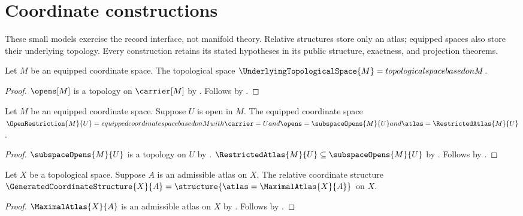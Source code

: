 

\section{Coordinate constructions}

These small models exercise the record interface, not manifold theory.
Relative structures store only an atlas; equipped spaces also store their
underlying topology. Every construction retains its stated hypotheses in
its public structure, exactness, and projection theorems.

\begin{construction}\label{underlying_topological_space}
    Let $M$ be an equipped coordinate space.
    The topological space $\UnderlyingTopologicalSpace{M}=
        topological space based on M$.
\end{construction}
\begin{proof}
    $\opens[M]$ is a topology on $\carrier[M]$
        by .
    Follows by .
\end{proof}

\begin{construction}\label{open_restriction}
    Let $M$ be an equipped coordinate space.
    Suppose $U$ is open in $M$.
    The equipped coordinate space $\OpenRestriction{M}{U}=
        equipped coordinate space based on M with
        \carrier=U and \opens=\subspaceOpens{M}{U}
        and \atlas=\RestrictedAtlas{M}{U}$.
\end{construction}
\begin{proof}
    $\subspaceOpens{M}{U}$ is a topology on $U$
        by .
    $\RestrictedAtlas{M}{U}\subseteq\subspaceOpens{M}{U}$
        by .
    Follows by .
\end{proof}

\begin{construction}\label{generated_coordinate_structure}
    Let $X$ be a topological space.
    Suppose $A$ is an admissible atlas on $X$.
    The relative coordinate structure
        $\GeneratedCoordinateStructure{X}{A}=
            \structure{\atlas=\MaximalAtlas{X}{A}}$ on $X$.
\end{construction}
\begin{proof}
    $\MaximalAtlas{X}{A}$ is an admissible atlas on $X$
        by .
    Follows by .
\end{proof}

